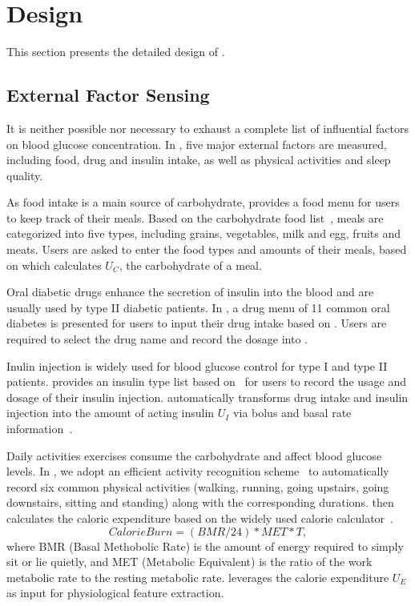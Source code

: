 
\section{Design}
\label{sec:design}
This section presents the detailed design of \sysname.

\subsection{External Factor Sensing}
\label{subsec:external}
It is neither possible nor necessary to exhaust a complete list of influential factors on blood glucose concentration.
In \sysname, five major external factors are measured, including food, drug and insulin intake, as well as physical activities and sleep quality.

As food intake is a main source of carbohydrate, \sysname provides a food menu for users to keep track of their meals.
Based on the carbohydrate food list~\cite{bib:carblist}, meals are categorized into five types, including grains, vegetables, milk and egg, fruits and meats.
Users are asked to enter the food types and amounts of their meals, based on which \sysname calculates $U_C$, the carbohydrate of a meal.

Oral diabetic drugs enhance the secretion of insulin into the blood and are usually used by type II diabetic patients.
In \sysname, a drug menu of 11 common oral diabetes is presented for users to input their drug intake based on \cite{bib:druglist}.
Users are required to select the drug name and record the dosage into \sysname.

Inulin injection is widely used for blood glucose control for type I and type II patients.
\sysname provides an insulin type list based on~\cite{bib:insulinlist} for users to record the usage and dosage of their insulin injection.
\sysname automatically transforms drug intake and insulin injection into the amount of acting insulin $U_I$ via bolus and basal rate information~\cite{bib:MAIHA14:Plis}.

Daily activities \eg exercises consume the carbohydrate and affect blood glucose levels.
In \sysname, we adopt an efficient activity recognition scheme~\cite{bib:KDDEN11:Kwapisz} to automatically record six common physical activities (walking, running, going upstairs, going downstairs, sitting and standing) along with the corresponding durations.
\sysname then calculates the caloric expenditure based on the widely used calorie calculator~\cite{bib:HealthStatus, bib:CalorieCounter}.
\begin{equation}\label{eq:calorie_burn}
  Calorie Burn = (BMR/24)*MET*T,
\end{equation}
where BMR (Basal Methobolic Rate) is the amount of energy required to simply sit or lie quietly, and MET (Metabolic Equivalent) is the ratio of the work metabolic rate to the resting metabolic rate.
\sysname leverages the calorie expenditure $U_E$ as input for physiological feature extraction.

